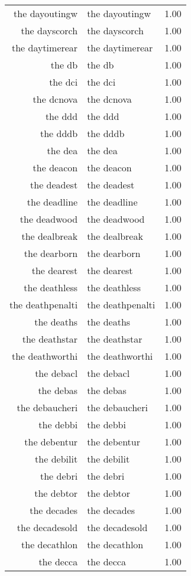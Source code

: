\begin{table}[ht]
\begin{tabular}{rlr}
  the dayoutingw & the dayoutingw & 1.00 \\ 
  the dayscorch & the dayscorch & 1.00 \\ 
  the daytimerear & the daytimerear & 1.00 \\ 
  the db & the db & 1.00 \\ 
  the dci & the dci & 1.00 \\ 
  the dcnova & the dcnova & 1.00 \\ 
  the ddd & the ddd & 1.00 \\ 
  the dddb & the dddb & 1.00 \\ 
  the dea & the dea & 1.00 \\ 
  the deacon & the deacon & 1.00 \\ 
  the deadest & the deadest & 1.00 \\ 
  the deadline & the deadline & 1.00 \\ 
  the deadwood & the deadwood & 1.00 \\ 
  the dealbreak & the dealbreak & 1.00 \\ 
  the dearborn & the dearborn & 1.00 \\ 
  the dearest & the dearest & 1.00 \\ 
  the deathless & the deathless & 1.00 \\ 
  the deathpenalti & the deathpenalti & 1.00 \\ 
  the deaths & the deaths & 1.00 \\ 
  the deathstar & the deathstar & 1.00 \\ 
  the deathworthi & the deathworthi & 1.00 \\ 
  the debacl & the debacl & 1.00 \\ 
  the debas & the debas & 1.00 \\ 
  the debaucheri & the debaucheri & 1.00 \\ 
  the debbi & the debbi & 1.00 \\ 
  the debentur & the debentur & 1.00 \\ 
  the debilit & the debilit & 1.00 \\ 
  the debri & the debri & 1.00 \\ 
  the debtor & the debtor & 1.00 \\ 
  the decades & the decades & 1.00 \\ 
  the decadesold & the decadesold & 1.00 \\ 
  the decathlon & the decathlon & 1.00 \\ 
  the decca & the decca & 1.00 \\ 

\end{tabular}
\end{table}
